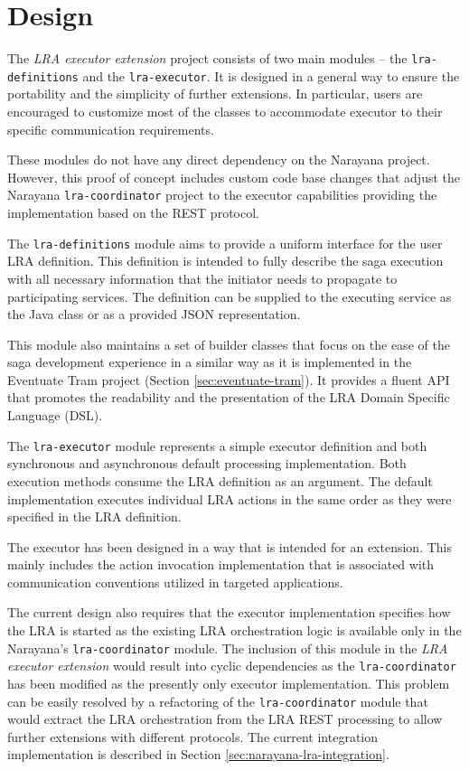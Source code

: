 \documentclass[oneside,
  digital, %
  table,   %
  lof,     %
  lot,     %
]{fithesis3}
\begin{document}
\section{Design}
\label{sec:extension-design}

The \textit{LRA executor extension} project consists of two main modules -- the \texttt{lra-definitions} and the \texttt{lra-executor}. It is designed in a general way to ensure the portability and the simplicity of further extensions. In particular, users are encouraged to customize most of the classes to accommodate executor to their specific communication requirements.

These modules do not have any direct dependency on the Narayana project. However, this proof of concept includes custom code base changes that adjust the Narayana \texttt{lra-coordinator} project to the executor capabilities providing the implementation based on the REST protocol.

The \texttt{lra-definitions} module aims to provide a uniform interface for the user LRA definition. This definition is intended to fully describe the saga execution with all necessary information that the initiator needs to propagate to participating services. The definition can be supplied to the executing service as the Java class or as a provided JSON representation.

This module also maintains a set of builder classes that focus on the ease of the saga development experience in a similar way as it is implemented in the Eventuate Tram project (Section \ref{sec:eventuate-tram}). It provides a fluent API that promotes the readability and the presentation of the LRA Domain Specific Language (DSL).  

The \texttt{lra-executor} module represents a simple executor definition and both synchronous and asynchronous default processing implementation. Both execution methods consume the LRA definition as an argument. The default implementation executes individual LRA actions in the same order as they were specified in the LRA definition.

The executor has been designed in a way that is intended for an extension. This mainly includes the action invocation implementation that is associated with communication conventions utilized in targeted applications. 

The current design also requires that the executor implementation specifies how the LRA is started as the existing LRA orchestration logic is available only in the Narayana's \texttt{lra-coordinator} module. The inclusion of this module in the \textit{LRA executor extension} would result into cyclic dependencies as the \texttt{lra-coordinator} has been modified as the presently only executor implementation. This problem can be easily resolved by a refactoring of the \texttt{lra-coordinator} module that would extract the LRA orchestration from the LRA REST processing to allow further extensions with different protocols. The current integration implementation is described in Section \ref{sec:narayana-lra-integration}.
\end{document}
